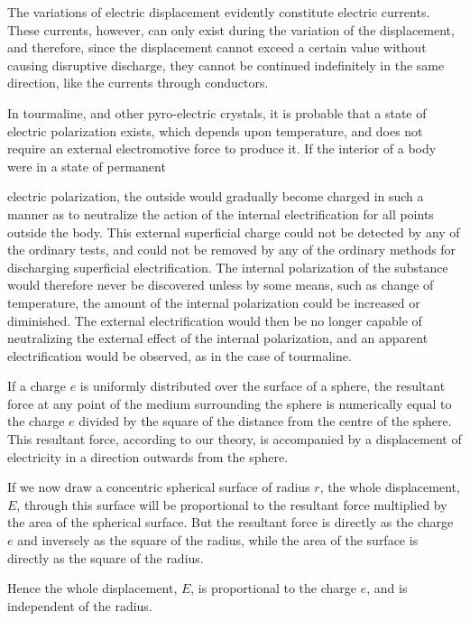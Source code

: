 \documentclass[11pt,a4paper]{article}
\begin{document}
The variations of electric displacement evidently constitute electric
currents. These currents, however, can only exist during the
variation of the displacement, and therefore, since the displacement
cannot exceed a certain value without causing disruptive discharge,
they cannot be continued indefinitely in the same direction, like the
currents through conductors.

In tourmaline, and other pyro-electric crystals, it is probable that
a state of electric polarization exists, which depends upon temperature,
and does not require an external electromotive force to produce it.
If the interior of a body were in a state of permanent

\clearpage
\setcounter{footnote}{0}

electric polarization, the outside would gradually become charged
in such a manner as to neutralize the action of the internal electrification
for all points outside the body. This external superficial charge could
not be detected by any of the ordinary tests, and could not be removed
by any of the ordinary methods for discharging superficial electrification.
The internal polarization of the substance would therefore never be
discovered unless by some means, such as change of temperature, the
amount of the internal polarization could be increased or diminished.
The external electrification would then be no longer capable of
neutralizing the external effect of the internal polarization, and an
apparent electrification would be observed, as in the case of tourmaline.

If a charge \(e\) is uniformly distributed over the surface of a sphere,
the resultant force at any point of the medium surrounding the sphere
is numerically equal to the charge \(e\) divided by the square of the
distance from the centre of the sphere. This resultant force, according
to our theory, is accompanied by a displacement of electricity in a
direction outwards from the sphere.

If we now draw a concentric spherical surface of radius \(r\), the
whole displacement, \(E\), through this surface will be proportional to
the resultant force multiplied by the area of the spherical surface.
But the resultant force is directly as the charge \(e\) and inversely as
the square of the radius, while the area of the surface is directly as
the square of the radius.

Hence the whole displacement, \(E\), is proportional to the charge
\(e\), and is independent of the radius.
\end{document}
